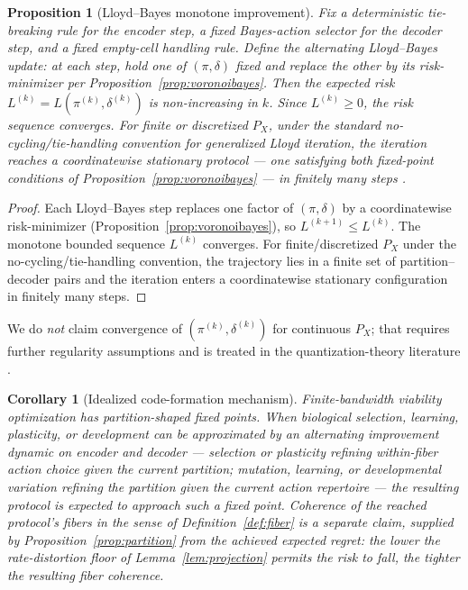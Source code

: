 \documentclass[12pt]{article}
\newtheorem{proposition}{Proposition}
\newtheorem{corollary}{Corollary}
\theoremstyle{definition}
\begin{document}
\begin{proposition}[Lloyd--Bayes monotone improvement]
\label{prop:lloydbayes}
Fix a deterministic tie-breaking rule for the encoder step, a fixed Bayes-action selector for the decoder step, and a fixed empty-cell handling rule. Define the alternating Lloyd--Bayes update: at each step, hold one of $(\pi,\delta)$ fixed and replace the other by its risk-minimizer per Proposition~\ref{prop:voronoibayes}. Then the expected risk $L^{(k)}=L(\pi^{(k)},\delta^{(k)})$ is non-increasing in $k$. Since $L^{(k)}\geq 0$, the risk sequence converges. For finite or discretized $P_X$, under the standard no-cycling/tie-handling convention for generalized Lloyd iteration, the iteration reaches a coordinatewise stationary protocol --- one satisfying both fixed-point conditions of Proposition~\ref{prop:voronoibayes} --- in finitely many steps \citep{linde1980,gray1998}.
\end{proposition}

\begin{proof}
Each Lloyd--Bayes step replaces one factor of $(\pi,\delta)$ by a coordinatewise risk-minimizer (Proposition~\ref{prop:voronoibayes}), so $L^{(k+1)}\leq L^{(k)}$. The monotone bounded sequence $L^{(k)}$ converges. For finite/discretized $P_X$ under the no-cycling/tie-handling convention, the trajectory lies in a finite set of partition--decoder pairs and the iteration enters a coordinatewise stationary configuration in finitely many steps.
\end{proof}

We do \emph{not} claim convergence of $(\pi^{(k)},\delta^{(k)})$ for continuous $P_X$; that requires further regularity assumptions and is treated in the quantization-theory literature \citep{linde1980,gray1998,sabin1986}.

\begin{corollary}[Idealized code-formation mechanism]
\label{cor:codeformation}
Finite-bandwidth viability optimization has partition-shaped fixed points. When biological selection, learning, plasticity, or development can be approximated by an alternating improvement dynamic on encoder and decoder --- selection or plasticity refining within-fiber action choice given the current partition; mutation, learning, or developmental variation refining the partition given the current action repertoire --- the resulting protocol is expected to approach such a fixed point. Coherence of the reached protocol's fibers in the sense of Definition~\ref{def:fiber} is a separate claim, supplied by Proposition~\ref{prop:partition} from the achieved expected regret: the lower the rate-distortion floor of Lemma~\ref{lem:projection} permits the risk to fall, the tighter the resulting fiber coherence.
\end{corollary}
\end{document}
